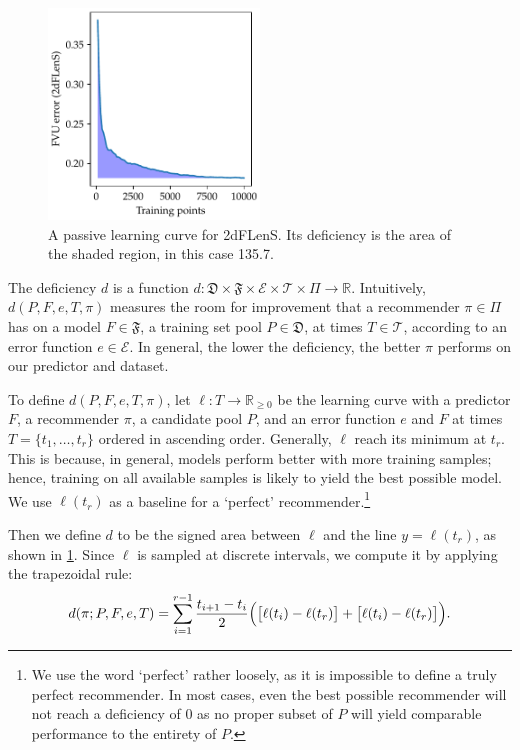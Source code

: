 \documentclass[11pt,twoside,openright]{report}
\newcommand\bbR{\mathbb{R}}
\newcommand\cE{\mathcal{E}}
\newcommand\cT{\mathcal{T}}
\newcommand\fD{\mathfrak{D}}
\newcommand\fF{\mathfrak{F}}
\begin{document}
\begin{figure}
    \centering
    \includegraphics[width=0.5\textwidth]{deficiency_example.pdf}
    \caption{A passive learning curve for 2dFLenS. Its deficiency is the area of the shaded region, in this case 135.7.}
    \label{fig:deficiency_example}
  \end{figure}

The deficiency $d$ is a function $d : \fD \times \fF \times \cE \times \cT \times \Pi \to \bbR$. Intuitively, $d(P, F, e, T, \pi)$ measures the room for improvement that a recommender $\pi \in \Pi$ has on a model $F \in \fF$, a training set pool $P \in \fD$, at times $T \in \cT$, according to an error function $e \in \cE$. In general, the lower the deficiency, the better $\pi$ performs on our predictor and dataset. \citep{Deficiency}

To define $d(P, F, e, T, \pi)$, let $\ell : T \to \bbR_{\geq0}$ be the learning curve with a predictor $F$, a recommender $\pi$, a candidate pool $P$, and an error function $e$ and $F$ at times $T = \{t_1, \dots, t_r\}$ ordered in ascending order. Generally, $\ell$ reach its minimum at $t_r$. This is because, in general, models perform better with more training samples; hence, training on all available samples is likely to yield the best possible model. We use $\ell(t_r)$ as a baseline for a `perfect' recommender.\footnote{We use the word `perfect' rather loosely, as it is impossible to define a truly perfect recommender. In most cases, even the best possible recommender will not reach a deficiency of $0$ as no proper subset of $P$ will yield comparable performance to the entirety of $P$.}

Then we define $d$ to be the signed area between $\ell$ and the line $y = \ell(t_r)$, as shown in \cref{fig:deficiency_example}. Since $\ell$ is sampled at discrete intervals, we compute it by applying the trapezoidal rule: \[
  d(\pi; P, F, e, T) = \sum_{i=1}^{r-1} \frac{t_{i+1} - t_i}{2}\Big(\big[\ell(t_i) - \ell(t_r)\big] + \big[\ell(t_i) - \ell(t_r)\big]\Big) \text.
\]
\end{document}
